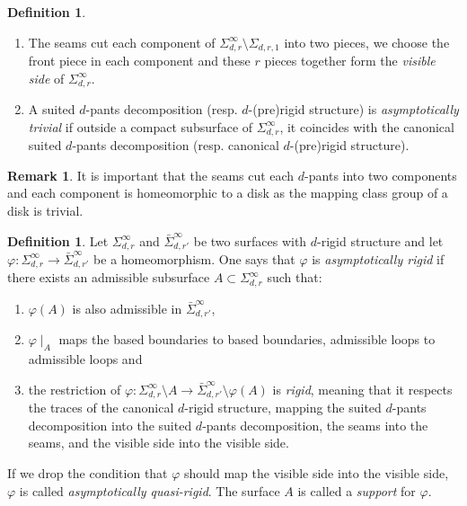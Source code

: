 \documentclass[11pt, a4paper]{amsart}
\theoremstyle{definition}
\newtheorem{rem}[thm]{Remark}
\newtheorem{defn}[thm]{Definition} %
\begin{document}
\begin{defn}
\begin{enumerate}
\item The seams cut each component of $\Sigma^{\infty}_{d,r} \setminus \Sigma_{d,r,1}$ into two pieces, we choose the front piece in each component and these $r$ pieces together form  the {\em visible side} of $\Sigma^{\infty}_{d,r}$.
\item A suited $d$-pants decomposition (resp. $d$-(pre)rigid structure) is {\em asymptotically
    trivial} if outside a compact subsurface of $\Sigma^{\infty}_{d,r}$, it coincides with the
  canonical suited $d$-pants decomposition (resp. canonical $d$-(pre)rigid structure).
\end{enumerate}
\end{defn}

\begin{rem}\label{rem-comp-disk}
It is important that the seams cut each $d$-pants into two components and each component is homeomorphic to a disk as the mapping class group of a disk is trivial.
\end{rem}





\begin{defn}\label{defn-asym-rgd}
 Let $\Sigma^{\infty}_{d,r} $ and $ \bar{\Sigma}^{\infty}_{d,r'}$ be two surfaces with $d$-rigid structure and let $\varphi:  \Sigma^{\infty}_{d,r} \to \bar{\Sigma}^{\infty}_{d,r'}$ be a homeomorphism. One says that
$\varphi$ is {\em asymptotically rigid} if there
exists an admissible subsurface $A\subset \Sigma^{\infty}_{d,r}$ such
  that:
 \begin{enumerate}
 \item $\varphi(A)$ is also admissible in $\bar{\Sigma}^{\infty}_{d,r'}$,
 \item $\varphi \mid_A$ maps the based boundaries to based  boundaries, admissible loops to admissible loops and  
 \item the restriction of $\varphi: \Sigma^{\infty}_{d,r} \setminus A\to \bar{\Sigma}^{\infty}_{d,r'}\setminus\varphi(A)$
 is {\em rigid}, meaning that it respects the traces of the canonical $d$-rigid structure, mapping the suited $d$-pants
 decomposition into the suited $d$-pants decomposition, the seams into the
 seams, and the visible side into the visible side. 
 \end{enumerate}
 If we drop the condition that  $\varphi$ should map the visible side into the visible side, $\varphi$ is called {\em asymptotically quasi-rigid}. The surface $A$ is called a {\em support} for $\varphi$.  
\end{defn}
\end{document}
